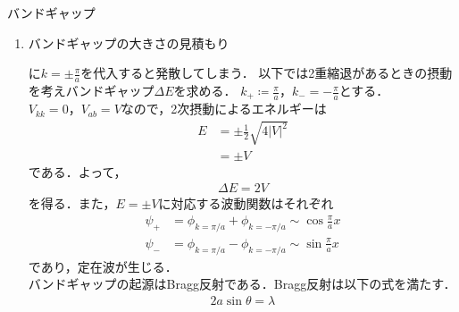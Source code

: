 \documentclass{report}
\begin{document}
\begin{myex}{バンドギャップ}{}
\begin{enumerate}
\begin{enumerate}
\begin{align}
          \end{align}
          が成りたつ．よって，$E(k) < \epsilon^{(0)}(k)$が成り立ち，摂動が加わった後のエネルギーは加わる前のエネルギーより小さくなる．
          \item 第1 Brillouinゾーン外側$\qty(k = k_2 > \frac{\pi  }{a})$の振る舞い\par
            第1 Brillouinゾーン内側のときと同様に考えると，
            \begin{align}
              \begin{dcases}
                \epsilon(k_2) \ll \epsilon^{(0)}(k_2 + g)\\
                \epsilon(k_2) > \epsilon^{(0)}(k_2 - g)
              \end{dcases}
            \end{align}
            を得る．よって，$E(k) > \epsilon^{(0)}(k)$が成り立ち，摂動が加わった後のエネルギーは加わる前のエネルギーより大きくなる．
          \end{enumerate}
          以上の議論により，結晶中の周期ポテンシャルによりバンドギャップが形成されることがわかった．
      \item バンドギャップの大きさの見積もり\par
        に$k = \pm\frac{\pi}{a}$を代入すると発散してしまう．
        以下では2重縮退があるときの摂動を考えバンドギャップ$\Delta E$を求める．
        $k_+ \coloneqq \frac{\pi}{a}$，$k_- = - \frac{\pi}{a}$とする．$V_{kk} = 0，V_{ab} = V$なので，2次摂動によるエネルギーは
        \begin{align}
          E& = \pm\frac{1}{2}\sqrt{4|V|^2}\\
          & = \pm V
        \end{align}
        である．よって，
        \begin{align}
          \Delta E = 2V
        \end{align}
        を得る．また，$E = \pm V$に対応する波動関数はそれぞれ
        \begin{align}
          \psi_{ + }& = \phi_{k = \pi/a} + \phi_{k = -\pi/a}\sim\cos\frac{\pi}{a}x\\
          \psi_{-}& = \phi_{k = \pi/a}-\phi_{k = -\pi/a}\sim\sin\frac{\pi}{a}x
        \end{align}
        であり，定在波が生じる．\\
    バンドギャップの起源はBragg反射である．Bragg反射は以下の式を満たす．
    \begin{align}
      2a\sin\theta = \lambda

\end{align}
\end{enumerate}
\end{myex}
\end{document}
